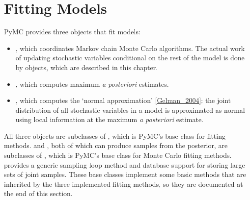 \documentclass[letterpaper,10pt,english]{sphinxmanual}
\begin{document}
\chapter{Fitting Models}
\label{modelfitting:chap-modelfitting}\label{modelfitting::doc}\label{modelfitting:fitting-models}
PyMC provides three objects that fit models:
\begin{itemize}
\item {} 
, which coordinates Markov chain Monte Carlo algorithms. The actual work of updating stochastic variables conditional on the rest of the model is done by  objects, which are described in this chapter.

\item {} 
, which computes maximum \emph{a posteriori} estimates.

\item {} 
, which computes the `normal approximation' {\hyperref[references:gelman-2004]{{[}Gelman\_2004{]}}}: the joint distribution of all stochastic variables in a model is approximated as normal using local information at the maximum \emph{a posteriori} estimate.

\end{itemize}

All three objects are subclasses of , which is PyMC's base class for fitting methods.  and , both of which can produce samples from the posterior, are subclasses of , which is PyMC's base class for Monte Carlo fitting methods.  provides a generic sampling loop method and database support for storing large sets of joint samples. These base classes implement some basic methods that are inherited by the three implemented fitting methods, so they are documented at the end of this section.
\end{document}
